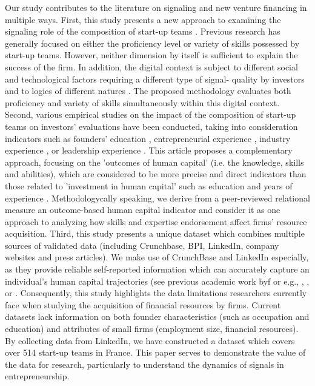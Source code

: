 \documentclass[12pt]{article}
\begin{document}
Our study contributes to the literature on signaling and new venture financing in multiple ways. First, this study presents a new approach to examining the signaling role of the composition of start-up teams \citep{beckman2007early}. Previous research has generally focused on either the proficiency level or variety of skills possessed by start-up teams. However, neither dimension by itself is sufficient to explain the success of the firm. In addition, the digital context is subject to different social and technological factors requiring a different type of signal- quality by investors and to logics of different natures \citep{nambisan2017digital}. The proposed methodology evaluates both proficiency and variety of skills simultaneously within this digital context. Second, various empirical studies on the impact of the composition of start-up teams on investors' evaluations have been conducted, taking into consideration indicators such as founders' education \citep{franke2008venture}, entrepreneurial experience \citep{beckman2007early}, industry experience \citep{becker2015new}, or leadership experience \citep{hoenig2015quality}. This article proposes a complementary approach, focusing on the 'outcomes of human capital' (i.e. the knowledge, skills and abilities), which are considered to be more precise and direct indicators than those related to 'investment in human capital' such as education and years of experience \citep{unger2011human, marvel2016human}. Methodologycally speaking, we derive from a peer-reviewed relational measure an outcome-based human capital indicator and consider it as one approach to analyzing how skills and expertise endorsement affect firms' resource acquisition. Third, this study presents a unique dataset which combines multiple sources of validated data (including Crunchbase, BPI, LinkedIn, company websites and press articles). We make use of CrunchBase and LinkedIn especially, as they provide reliable self-reported information which can accurately capture an individual's human capital trajectories (see previous academic work byf or e.g.,  \citet{sako2020scaling}, \citet{rapanta2017linkedin}, or \citet{reese2020should}. Consequently, this study highlights the data limitations researchers currently face when studying the acquisition of financial resources by firms. Current datasets lack information on both founder characteristics (such as occupation and education) and attributes of small firms (employment size, financial resources). By collecting data from LinkedIn, we have constructed a dataset which covers over 514 start-up teams in France. This paper serves to demonstrate the value of the data for research, particularly to understand the dynamics of signals in entrepreneurship.
\end{document}

